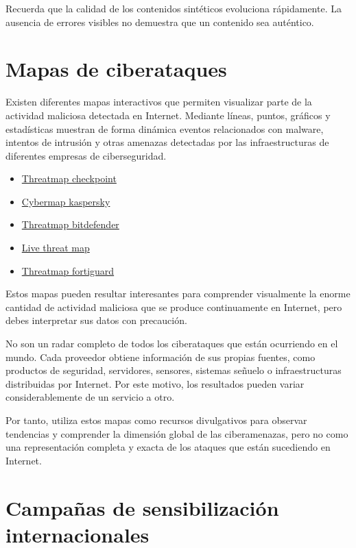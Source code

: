 \documentclass[
  spanish,
  a4paper,
  openany]{book}
\begin{document}
Recuerda que la calidad de los contenidos sintéticos evoluciona rápidamente. La ausencia de errores visibles no demuestra que un contenido sea auténtico.

\section{Mapas de ciberataques}\label{mapas-de-ciberataques}

Existen diferentes mapas interactivos que permiten visualizar parte de la actividad maliciosa detectada en Internet. Mediante líneas, puntos, gráficos y estadísticas muestran de forma dinámica eventos relacionados con malware, intentos de intrusión y otras amenazas detectadas por las infraestructuras de diferentes empresas de ciberseguridad.

\begin{itemize}
\item
  \href{https://threatmap.checkpoint.com/}{Threatmap checkpoint}
\item
  \href{https://cybermap.kaspersky.com/es}{Cybermap kaspersky}
\item
  \href{https://threatmap.bitdefender.com/}{Threatmap bitdefender}
\item
  \href{https://livethreatmap.radware.com/}{Live threat map}
\item
  \href{https://threatmap.fortiguard.com/}{Threatmap fortiguard}
\end{itemize}

Estos mapas pueden resultar interesantes para comprender visualmente la enorme cantidad de actividad maliciosa que se produce continuamente en Internet, pero debes interpretar sus datos con precaución.

No son un radar completo de todos los ciberataques que están ocurriendo en el mundo. Cada proveedor obtiene información de sus propias fuentes, como productos de seguridad, servidores, sensores, sistemas señuelo o infraestructuras distribuidas por Internet. Por este motivo, los resultados pueden variar considerablemente de un servicio a otro.

Por tanto, utiliza estos mapas como recursos divulgativos para observar tendencias y comprender la dimensión global de las ciberamenazas, pero no como una representación completa y exacta de los ataques que están sucediendo en Internet.

\section{Campañas de sensibilización internacionales}\label{campauxf1as-de-sensibilizaciuxf3n-internacionales}
\end{document}
